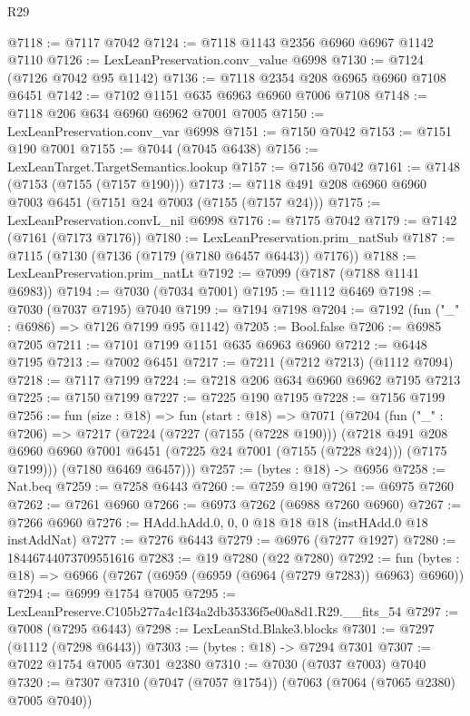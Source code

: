 \begin{lexlean}{R29}
\begin{coremodule}
@7118 := @7117 @7042
@7124 := @7118 @1143 @2356 @6960 @6967 @1142 @7110
@7126 := LexLeanPreservation.conv_value @6998
@7130 := @7124 (@7126 @7042 @95 @1142)
@7136 := @7118 @2354 @208 @6965 @6960 @7108 @6451
@7142 := @7102 @1151 @635 @6963 @6960 @7006 @7108
@7148 := @7118 @206 @634 @6960 @6962 @7001 @7005
@7150 := LexLeanPreservation.conv_var @6998
@7151 := @7150 @7042
@7153 := @7151 @190 @7001
@7155 := @7044 (@7045 @6438)
@7156 := LexLeanTarget.TargetSemantics.lookup
@7157 := @7156 @7042
@7161 := @7148 (@7153 (@7155 (@7157 @190)))
@7173 := @7118 @491 @208 @6960 @6960 @7003 @6451 (@7151 @24 @7003 (@7155 (@7157 @24)))
@7175 := LexLeanPreservation.convL_nil @6998
@7176 := @7175 @7042
@7179 := @7142 (@7161 (@7173 @7176))
@7180 := LexLeanPreservation.prim_natSub
@7187 := @7115 (@7130 (@7136 (@7179 (@7180 @6457 @6443)) @7176))
@7188 := LexLeanPreservation.prim_natLt
@7192 := @7099 (@7187 (@7188 @1141 @6983))
@7194 := @7030 (@7034 @7001)
@7195 := @1112 @6469
@7198 := @7030 (@7037 @7195) @7040
@7199 := @7194 @7198
@7204 := @7192 (fun ("_" : @6986) => @7126 @7199 @95 @1142)
@7205 := Bool.false
@7206 := @6985 @7205
@7211 := @7101 @7199 @1151 @635 @6963 @6960
@7212 := @6448 @7195
@7213 := @7002 @6451
@7217 := @7211 (@7212 @7213) (@1112 @7094)
@7218 := @7117 @7199
@7224 := @7218 @206 @634 @6960 @6962 @7195 @7213
@7225 := @7150 @7199
@7227 := @7225 @190 @7195
@7228 := @7156 @7199
@7256 := fun (size : @18) =>
  fun (start : @18) =>
  @7071
    (@7204
      (fun ("_" : @7206) =>
      @7217
        (@7224
          (@7227 (@7155 (@7228 @190)))
          (@7218
            @491
            @208
            @6960
            @6960
            @7001
            @6451
            (@7225 @24 @7001 (@7155 (@7228 @24)))
            (@7175 @7199)))
        (@7180 @6469 @6457)))
@7257 := (bytes : @18) -> @6956
@7258 := Nat.beq
@7259 := @7258 @6443
@7260 := @7259 @190
@7261 := @6975 @7260
@7262 := @7261 @6960
@7266 := @6973 @7262 (@6988 @7260 @6960)
@7267 := @7266 @6960
@7276 := HAdd.hAdd.{0, 0, 0} @18 @18 @18 (instHAdd.{0} @18 instAddNat)
@7277 := @7276 @6443
@7279 := @6976 (@7277 @1927)
@7280 := 18446744073709551616
@7283 := @19 @7280 (@22 @7280)
@7292 := fun (bytes : @18) => @6966 (@7267 (@6959 (@6959 (@6964 (@7279 @7283)) @6963) @6960))
@7294 := @6999 @1754 @7005
@7295 := LexLeanPreserve.C105b277a4c1f34a2db35336f5e00a8d1.R29.__fits_54
@7297 := @7008 (@7295 @6443)
@7298 := LexLeanStd.Blake3.blocks
@7301 := @7297 (@1112 (@7298 @6443))
@7303 := (bytes : @18) -> @7294 @7301
@7307 := @7022 @1754 @7005 @7301 @2380
@7310 := @7030 (@7037 @7003) @7040
@7320 := @7307 @7310 (@7047 (@7057 @1754)) (@7063 (@7064 (@7065 @2380) @7005 @7040))

\end{coremodule}
\end{lexlean}
